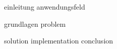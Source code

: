 \begin{comment}
Guidelines:
Seiten: 50
Präsentation: 30 min / Disskusion: 15 min
sonarqube als code scan (nur ein vorschlag)
\end{comment}

{einleitung}
{anwendungsfeld}

{grundlagen}
{problem}

\begin{comment}
diese lösen das problem der teuren clients ABER clients müssen dann möglichst optimal auf die broker verteilt werden
-> load balancer

iot mqtt threat model ? maybe show this ?

- If your work is based on preliminary work, then outline this preliminary work: "The de-ployment into production is itself semi-automatic. In a continuous integration pipeline..."
- Do some research forrelated work, e.g., commercial products, research prototypes or con-ceptual research that have the same or similar objectives like your work. Compare and de-lineate your work with/from the related work.
- Keep an eye on the proper citation of the works you are describing
- Conclude this chapter with some insufficiencies or shortcomings of the preliminary or related work. This should motivate the necessity of your work.
\end{comment}

{solution}
{implementation}
{conclusion}

\newpage
\begin{comment}
- Again, summarize your work. This time you can assume that reader have read the rest of the document, i.e., you are free to use even domain-specific terms.
- In case of a master thesis in "Technische Informatik", you will have to provide an addi-tional "technical report" in English of 4-8 pages (cf. examination regulation document, §28, 1d). It is okay for me if you use this technical report as the summary here.
- Usually, during your project or thesis new and extended questions arise that are not dealt with in your project or thesis due effort reasons. Please delineate these in the outlook.
\end{comment}
